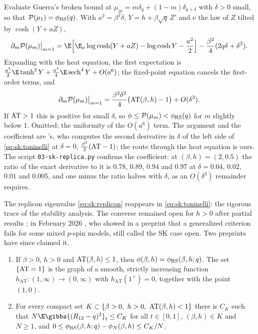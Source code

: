 \begin{refsection}
\begin{proofsketch}
Evaluate Guerra's broken bound at $\mu_m=m\delta_q+(1-m)\delta_{q+\delta}$ with $\delta>0$ small, so that $\mathcal{P}(\mu_1)=\phi_{\mathrm{RS}}(q)$. With $a^2=\beta^2\delta$, $Y=h+\beta\sqrt q\,Z'$ and $\nu$ the law of $Z$ tilted by $\cosh(Y+aZ)$,
\[
\partial_m\skPar(\mu_m)\big|_{m=1}=\E\Bigl[\E_\nu\log\cosh(Y+aZ)-\log\cosh Y-\frac{a^2}2\Bigr]-\frac{\beta^2}4(2q\delta+\delta^2).
\]
Expanding with the heat equation, the first expectation is $\frac{a^2}2\E\tanh^2Y+\frac{a^4}4\E\sksech^4Y+O(a^6)$; the fixed-point equation cancels the first-order terms, and
\begin{equation}\label{eq:sk:toninelli}
\partial_m\mathcal{P}(\mu_m)\big|_{m=1}=\frac{\beta^2\delta^2}4\bigl(\mathrm{AT}(\beta,h)-1\bigr)+O(\delta^3).
\end{equation}
If $\mathrm{AT}>1$ this is positive for small $\delta$, so $\phi\le\mathcal{P}(\mu_m)<\phi_{\mathrm{RS}}(q)$ for $m$ slightly below $1$. Omitted: the uniformity of the $O(a^6)$ term. The argument and the coefficient are \textcite{Toninelli2002}'s, who computes the second derivative in $\delta$ of the left side of \eqref{eq:sk:toninelli} at $\delta=0$, $\frac{\beta^2}2(\mathrm{AT}-1)$; the route through the heat equation is ours. The script \texttt{03-sk-replica.py} confirms the coefficient: at $(\beta,h)=(2,0.5)$ the ratio of the exact derivative to it is $0.78$, $0.89$, $0.94$ and $0.97$ at $\delta=0.04$, $0.02$, $0.01$ and $0.005$, and one minus the ratio halves with $\delta$, as an $O(\delta^3)$ remainder requires.
\end{proofsketch}

The replicon eigenvalue \eqref{eq:sk:replicon} reappears in \eqref{eq:sk:toninelli}: the rigorous trace of the stability analysis. The converse remained open for $h>0$ after partial results \parencite{JagannathTobasco2017a,BrenneckeYau2022}; in February 2026 \textcite{MourratSchertzer2026}, who showed in a preprint that a generalized criterion fails for some mixed $p$-spin models, still called the SK case open. Two preprints have since claimed it.

\begin{theorem}\label{thm:sk:atline}
\leavevmode
\begin{enumerate}
\item \parencite[Thm.~1.1 and Prop.~1.2]{Lopatto2026a} If $\beta>0$, $h>0$ and $\mathrm{AT}(\beta,h)\le1$, then $\phi(\beta,h)=\phi_{\mathrm{RS}}(\beta,h;q)$. The set $\{\mathrm{AT}=1\}$ is the graph of a smooth, strictly increasing function $h_{\mathrm{AT}}\colon(1,\infty)\to(0,\infty)$ with $h_{\mathrm{AT}}(1^+)=0$, together with the point $(1,0)$.
\item \parencite[Thm.~1.1]{KusuokaNakajima2026b} For every compact set $K\subset\{\beta>0,\ h>0,\ \skAT(\beta,h)<1\}$ there is $C_K$ such that $N\E\gibbs{(R_{12}-q)^2}_t\le C_K$ for all $t\in[0,1]$, $(\beta,h)\in K$ and $N\ge1$, and $0\le\phi_{\mathrm{RS}}(\beta,h;q)-\phi_N(\beta,h)\le C_K/N$.
\end{enumerate}
\end{theorem}


\end{refsection}
